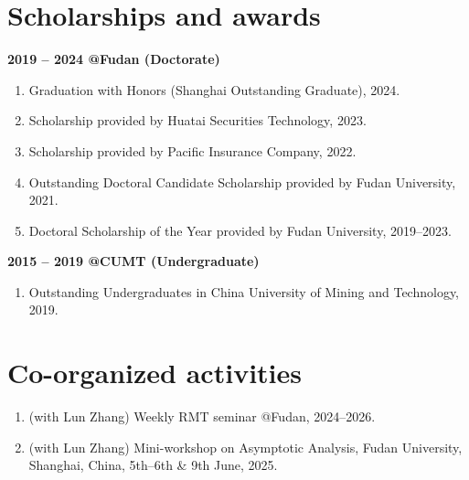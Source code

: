 \documentclass[margin]{res}
\begin{document}
\begin{resume}
\section{Scholarships and awards}
\textbf{2019 -- 2024 @Fudan (Doctorate)}
\begin{enumerate}[--]
    \item Graduation with Honors (Shanghai Outstanding Graduate), 2024.
    \item Scholarship provided by Huatai Securities Technology, 2023.
    \item Scholarship provided by Pacific Insurance Company, 2022. 
    \item Outstanding Doctoral Candidate Scholarship provided by Fudan University, 2021. 
    \item Doctoral Scholarship of the Year provided by Fudan University, 2019--2023. 
\end{enumerate}

\textbf{2015 -- 2019 @CUMT (Undergraduate)}
\begin{enumerate}[--]
    \item Outstanding Undergraduates in China University of Mining and Technology, 2019.
\end{enumerate}


\section{Co-organized activities}
\begin{enumerate}[--]
    \item (with Lun Zhang) Weekly RMT seminar @Fudan, 2024--2026.
    \item (with Lun Zhang) Mini-workshop on Asymptotic Analysis, Fudan University, Shanghai, China, 5th--6th \& 9th June, 2025.
\end{enumerate}


\end{resume}
\end{document}
